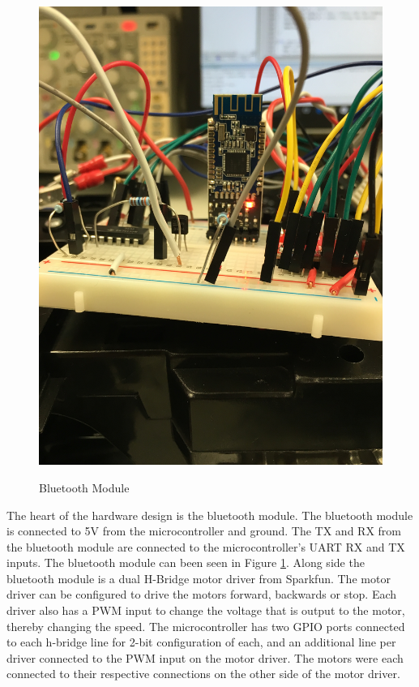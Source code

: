 \documentclass[12pt]{article}
\begin{document}
\begin{figure}[H]
\begin {center}
\includegraphics[scale=.10]{bluetooth}\\
\caption{Bluetooth Module}
\label{fig:bluetooth}
\end {center}
\end{figure}

The heart of the hardware design is the bluetooth module. The bluetooth module is connected to 5V from the microcontroller and ground. The TX and RX from the bluetooth module are connected to the microcontroller's UART RX and TX inputs. The bluetooth module can been seen in Figure \ref{fig:bluetooth}. Along side the bluetooth module is a dual H-Bridge motor driver from Sparkfun. The motor driver can be configured to drive the motors forward, backwards or stop. Each driver also has a PWM input to change the voltage that is output to the motor, thereby changing the speed. The microcontroller has two GPIO ports connected to each h-bridge line for 2-bit configuration of each, and an additional line per driver connected to the PWM input on the motor driver. The motors were each connected to their respective connections on the other side of the motor driver. \\
\end{document}
